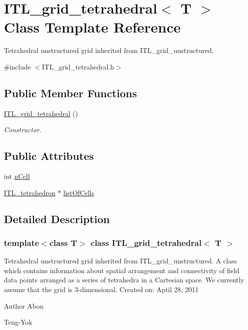 \hypertarget{classITL__grid__tetrahedral}{
\section{ITL\_\-grid\_\-tetrahedral$<$ T $>$ Class Template Reference}
\label{classITL__grid__tetrahedral}
}


Tetrahedral unstructured grid inherited from ITL\_\-grid\_\-unstructured.  




{\ttfamily \#include $<$ITL\_\-grid\_\-tetrahedral.h$>$}

\subsection*{Public Member Functions}
\begin{DoxyCompactItemize}
\item 
\hyperlink{classITL__grid__tetrahedral_a1687d1ed412ceb76d008a871eb038936}{ITL\_\-grid\_\-tetrahedral} ()
\begin{DoxyCompactList}\small\item\em Constructor. \item\end{DoxyCompactList}\end{DoxyCompactItemize}
\subsection*{Public Attributes}
\begin{DoxyCompactItemize}
\item 
int \hyperlink{classITL__grid__tetrahedral_a4f290e007f6b76fc039de3faf68276df}{nCell}
\item 
\hyperlink{classITL__tetrahedron}{ITL\_\-tetrahedron} $\ast$ \hyperlink{classITL__grid__tetrahedral_a4ce6a6ca28a0f7ba4c62e2a92eb6076e}{listOfCells}
\end{DoxyCompactItemize}


\subsection{Detailed Description}
\subsubsection*{template$<$class T$>$ class ITL\_\-grid\_\-tetrahedral$<$ T $>$}

Tetrahedral unstructured grid inherited from ITL\_\-grid\_\-unstructured. A class which contains information about spatial arrangement and connectivity of field data points arranged as a series of tetrahedra in a Cartesian space. We currently assume that the grid is 3-\/dimensional. Created on: Aptil 28, 2011 \begin{DoxyAuthor}{Author}
Abon 

Teng-\/Yok 
\end{DoxyAuthor}


